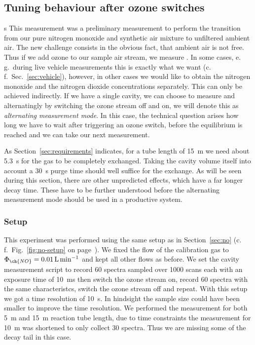 \subsection{Tuning behaviour after ozone switches}
\label{sec:switch}
s
This measurement was a preliminary measurement to perform the
transition from our pure nitrogen monoxide and synthetic air mixture
to unfiltered ambient air. The new challenge consists in the obvious
fact, that ambient air is not  free. Thus if we add ozone to
our sample air stream, we measure . In some
cases, e.\,g.\ during live vehicle measurements this is exactly what
we want (c.\,f.~Sec.~\ref{sec:vehicle}), however, in other cases we
would like to obtain the nitrogen monoxide and the nitrogen dioxide
concentrations separately. This can only be achieved indirectly. If we
have a single cavity, we can choose to measure  and 
alternatingly by switching the ozone stream off and on, we will denote
this as \emph{alternating measurement mode}. In this case, the technical
question arises how long we have to wait after triggering an ozone
switch, before the equilibrium is reached and we can take our next
measurement.

As Section~\ref{sec:requirements} indicates, for a tube length of
\SI{15}{\meter} we need about \SI{5.3}{\second} for the gas to be
completely exchanged. Taking the cavity volume itself into account a
\SI{30}{\second} purge time should well suffice for the exchange. As
will be seen during this section, there are other unpredicted effects,
which have a far longer decay time. These have to be further
understood before the alternating measurement mode should be used in a
productive system.

\subsubsection{Setup}
\label{sec:switch-setup}

This experiment was performed using the same setup as in
Section~\ref{sec:no} (c.\,f.\ Fig.~\ref{fig:no-setup} on
page~\pageref{fig:no-setup}). We fixed the flow of the 
calibration gas to $\Phi_{\ch{NO}} = \SI{0.01}{\liter\per\minute}$ and
kept all other flows as before. We set the cavity measurement script
to record 60 spectra sampled over 1000 scans each with an exposure
time of \SI{10}{\milli\second} then switch the ozone stream on, record
60 spectra with the same characteristcs, switch the ozone stream off
and repeat. With this setup we got a time resolution of
\SI{10}{\second}. In hindsight the sample size could have been
smaller to improve the time resolution. We performed the measurement
for both \SI{5}{\meter} and \SI{15}{\meter} reaction tube length, due
to time constraints the measurement for \SI{10}{\meter} was shortened
to only collect 30 spectra. Thus we are missing some of the decay tail
in this case.

